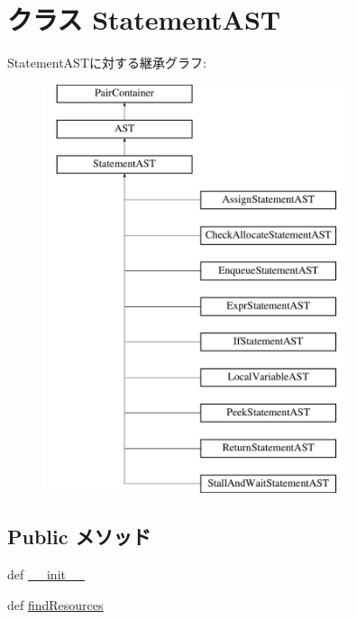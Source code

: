 \hypertarget{classslicc_1_1ast_1_1StatementAST_1_1StatementAST}{
\section{クラス StatementAST}
\label{classslicc_1_1ast_1_1StatementAST_1_1StatementAST}
}
StatementASTに対する継承グラフ:\begin{figure}[H]
\begin{center}
\leavevmode
\includegraphics[height=12cm]{classslicc_1_1ast_1_1StatementAST_1_1StatementAST}
\end{center}
\end{figure}
\subsection*{Public メソッド}
\begin{DoxyCompactItemize}
\item 
def \hyperlink{classslicc_1_1ast_1_1StatementAST_1_1StatementAST_ac775ee34451fdfa742b318538164070e}{\_\-\_\-init\_\-\_\-}
\item 
def \hyperlink{classslicc_1_1ast_1_1StatementAST_1_1StatementAST_abd195c795639b490ba2de4c1246105f1}{findResources}
\end{DoxyCompactItemize}


